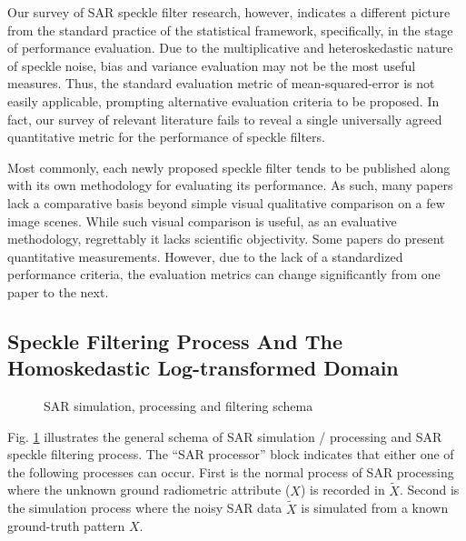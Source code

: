 Our survey of SAR speckle filter research, however, indicates 
	a different picture from the standard practice of the statistical framework, 
	specifically, in the stage of performance evaluation. 
Due to the multiplicative and heteroskedastic nature of speckle noise, 
	bias and variance evaluation may not be the most useful measures. 
Thus, the standard evaluation metric of mean-squared-error is not easily applicable,
	prompting alternative evaluation criteria to be proposed.
In fact, our survey of relevant literature fails to reveal 
	a single universally agreed quantitative metric for the performance of speckle filters.

Most commonly, each newly proposed speckle filter tends to be published along with its own methodology for evaluating its 
	performance. 
As such, many papers lack a comparative basis beyond simple visual qualitative comparison on a few image scenes. 
While such visual comparison is useful, as an evaluative methodology, regrettably it lacks scientific objectivity. 
Some papers do present quantitative measurements. 
However, due to the lack of a standardized performance criteria, 
	the evaluation metrics can change significantly from one paper to the next.

\subsection{ Speckle Filtering Process And The Homoskedastic Log-transformed Domain}
\label{sec:schema_log_images}

\begin{figure}[h]
 \centering
 \epsfxsize=2.4in
 \epsfysize=1.2in
\caption{SAR simulation, processing and filtering schema}
\label{fig:simul_process_filter_schema}
\end{figure}

Fig. \ref{fig:simul_process_filter_schema} illustrates the general schema of SAR simulation / processing and 
SAR speckle filtering process.
The ``SAR processor'' block indicates that either one of the following processes can occur.
First is the normal process of SAR processing where the unknown ground radiometric attribute ($X$) is recorded 
in $\tilde{X}$. Second is the simulation process where the noisy SAR data $\tilde{X}$ is simulated from a known 
ground-truth pattern $X$.

